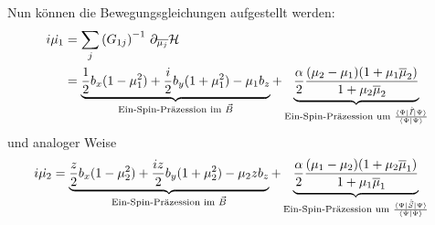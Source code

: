 \noindent Nun können die Bewegungsgleichungen aufgestellt werden:
\begin{align}
    i\dot{\mu_1} &= \sum_{j}\left(G_{1j}\right)^{-1}\thinspace \partial_{\overline{\mu_j}}\mathcal{H}  \\
    &=\underbrace{\frac{1}{2}b_x(1-\mu_1^2) + \frac{i}{2}b_y(1+\mu_1^2) -\mu_1 b_z}_{\text{Ein-Spin-Präzession im } \vec{B}} +\underbrace{\frac{\alpha}{2} \frac{(\mu_2-\mu_1)(1+\mu_1\overline{\mu}_2)}{1+\mu_2\overline{\mu}_2}}_{\text{Ein-Spin-Präzession um } \frac{\bra{\Psi}\hat{\vec{I}}\ket{\Psi}}{\bra{\Psi}\ket{\Psi}}  }    
\end{align}
und analoger Weise 
\begin{align}
    i\dot{\mu_2} &= \underbrace{\frac{z}{2}b_x(1-\mu_2^2) + \frac{iz}{2}b_y(1+\mu_2^2) -\mu_2 z b_z}_{\text{Ein-Spin-Präzession im } \vec{B}} +\underbrace{\frac{\alpha}{2} \frac{(\mu_1-\mu_2)(1+\mu_2\overline{\mu}_1)}{1+\mu_1\overline{\mu}_1}}_{\text{Ein-Spin-Präzession um } \frac{\bra{\Psi}\hat{\vec{S}}\ket{\Psi}}{\bra{\Psi}\ket{\Psi}}  }
\end{align}

